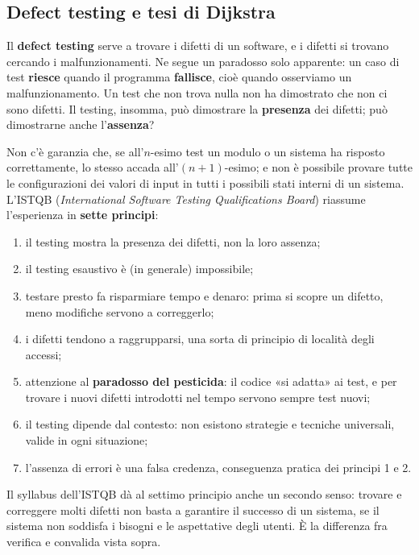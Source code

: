 \subsection{Defect testing e tesi di Dijkstra}

Il \textbf{defect testing} serve a trovare i difetti di un software, e i difetti si trovano cercando i
malfunzionamenti. Ne segue un paradosso solo apparente: un caso di test \textbf{riesce} quando il programma
\textbf{fallisce}, cioè quando osserviamo un malfunzionamento. Un test che non trova nulla non ha dimostrato che non ci
sono difetti. Il testing, insomma, può dimostrare la \textbf{presenza} dei difetti; può dimostrarne anche
l'\textbf{assenza}?


Non c'è garanzia che, se all'\(n\)-esimo test un modulo o un sistema ha risposto correttamente, lo stesso accada
all'\((n+1)\)-esimo; e non è possibile provare tutte le configurazioni dei valori di input in tutti i possibili stati
interni di un sistema. L'ISTQB (\textit{International Software Testing Qualifications Board}) riassume l'esperienza in
\textbf{sette principi}:

\begin{enumerate}
  \item il testing mostra la presenza dei difetti, non la loro assenza;
  \item il testing esaustivo è (in generale) impossibile;
  \item testare presto fa risparmiare tempo e denaro: prima si scopre un difetto, meno modifiche servono a correggerlo;
  \item i difetti tendono a raggrupparsi, una sorta di principio di località degli accessi;
  \item attenzione al \textbf{paradosso del pesticida}: il codice «si adatta» ai test, e per trovare i nuovi difetti
        introdotti nel tempo servono sempre test nuovi;
  \item il testing dipende dal contesto: non esistono strategie e tecniche universali, valide in ogni situazione;
  \item l'assenza di errori è una falsa credenza, conseguenza pratica dei principi 1 e 2.
\end{enumerate}

Il syllabus dell'ISTQB dà al settimo principio anche un secondo senso: trovare e correggere molti difetti non basta a
garantire il successo di un sistema, se il sistema non soddisfa i bisogni e le aspettative degli utenti. È la
differenza fra verifica e convalida vista sopra.

